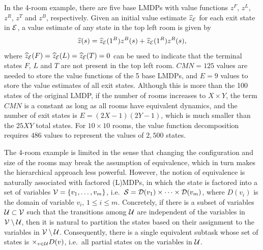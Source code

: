 \begin{example}[1] %
In the 4-room example, there are five base LMDPs with value functions $z^F$, $z^L$, $z^R$, $z^T$ and $z^B$, respectively. Given an initial value estimate $\widehat{z}_{\mathcal{E}}$ for each exit state in $\mathcal{E}$, a value estimate of any state in the top left room is given by \[\linebreak\widehat{z}(s)=\widehat{z}_\cE(1^B) z^B(s) + \widehat{z}_\cE(1^R) z^R(s),\] where $\widehat{z}_{\mathcal{E}}(F)=\widehat{z}_{\mathcal{E}}(L)=\widehat{z}_{\mathcal{E}}(T)=0$ can be used to indicate that the terminal states $F$, $L$ and $T$ are not present in the top left room. $CMN = 125$ values are needed to store the value functions of the 5 base LMDPs, and $E=9$ values to store the value estimates of all exit states. Although this is more than the 100 states of the original LMDP, if the number of rooms increases to $X\times Y$, the term $CMN$ is a constant as long as all rooms have equivalent dynamics, and the number of exit states is $E=(2X-1)(2Y-1)$, which is much smaller than the $25 XY$ total states. For $10\times 10$ rooms, the value function decomposition requires $486$ values to represent the values of $2{,}500$ states.
\end{example}

The 4-room example is limited in the sense that changing the configuration and size of the rooms may break the assumption of equivalence, which in turn makes the hierarchical approach less powerful. However, the notion of equivalence is naturally associated with factored (L)MDPs, in which the state is factored into a set of variables $\mathcal{V}=\{v_1,\ldots,v_m\}$, i.e.~$\mathcal{S}=\mathcal{D}(v_1)\times\cdots\times\mathcal{D}(v_m)$, where $D(v_i)$ is the domain of variable $v_i$, $1\leq i\leq m$.
Concretely, if there is a subset of variables $\mathcal{U}\subset\mathcal{V}$ such that the transitions among $\mathcal{U}$ are independent of the variables in $\mathcal{V}\setminus\mathcal{U}$, then it is natural to partition the states based on their assignment to the variables in $\mathcal{V}\setminus\mathcal{U}$. Consequently, there is a single equivalent subtask whose set of states is $\times_{v\in\mathcal{U}}D(v)$, i.e.~all partial states on the variables in $\mathcal{U}$.


